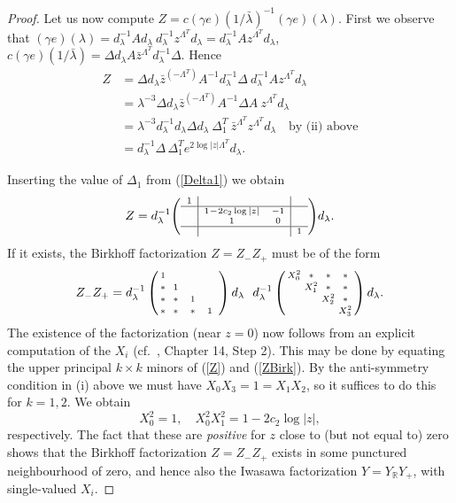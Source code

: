 \documentclass[a4paper,12pt,leqno]{amsart}
\numberwithin{equation}{section}
\theoremstyle{plain}
\theoremstyle{definition}
\newcommand{\R}{\mathbb R}
\newcommand{\la}{\lambda}
\newcommand{\De}{\Delta}
\newcommand{\bsp}{\left(\begin{smallmatrix}}
\newcommand{\esp}{\end{smallmatrix}\right)}
\newcommand{\MM}{\Lambda}
\newcommand{\gazi}{\gamma}
\begin{document}
{\begin{proof}
Let us now compute $Z=c( \gazi  e )(1/\bar\la)^{-1}  (\gazi e)(\la)$. 
First we observe that $(\gazi e)(\la)= d_\la^{-1}A d_\la\ d_\la^{-1} z^{\MM^T} d_\la = d_\la^{-1} A z^{\MM^T} d_\la$, 
$c( \gazi  e )(1/\bar\la)=
\De d_\la A \bar z^{\MM^T} d_\la^{-1} \De$.   
Hence
\begin{align*}
Z&=
\De d_\la \bar z^{(-\MM^T)} A^{-1}  d_\la^{-1} \De  
\ 
d_\la^{-1} A z^{\MM^T} d_\la
\\
&=\la^{-3} \De d_\la \bar z^{(-\MM^T)} A^{-1} \De A\   z^{\MM^T} d_\la\\
&=\la^{-3} d_\la^{-1} d_\la \De d_\la\   \De_1^T\  \bar z^{\MM^T} z^{\MM^T} d_\la \quad\text{by (ii) above}
\\
&=d_\la^{-1} \De\,  \De_1^T e^{2\log\vert z\vert \MM^T} d_\la.
\end{align*}
 
Inserting the value of $\De_1$ from (\ref{Delta1}) we obtain
\begin{equation}\label{Z}
Z=
d_\la^{-1} 
{\scriptsize
\left(
\begin{array}{c|cc|c}
1 & & & \\
\hline
 & 1\!-\!2c_2\log\vert z\vert & -1 & \\
 & 1 & 0 & \\
 \hline
 & & & 1
\end{array}
\right)
}
d_\la.
\end{equation}
If it exists, the Birkhoff factorization $Z=Z_-Z_+$ must be of the form
\begin{equation}\label{ZBirk}
Z_-Z_+=
d_\la^{-1} 
\bsp
 \vphantom{ X_0^2} 1 & \hphantom{ X_0^2} & \hphantom{ X_0^2} & \hphantom{ X_0^2} \\
* &  \vphantom{ X_0^2} 1 & & \\
* & * &  \vphantom{ X_0^2} 1 & \\
* & * & * &  \vphantom{ X_0^2} 1
\esp
d_\la
\ \ 
d_\la^{-1} 
\bsp
 X_0^2 & * &* & *\\
  &  X_1^2 & *& *\\
  &   &  X_2^2 & *\\
  &   &   &  X_3^2
\esp
d_\la.
\end{equation}
The existence of the factorization (near $z=0$) now follows from an explicit computation of the $ X_i$ (cf.\  \cite{Gu97}, Chapter 14, Step 2).  This may be done by equating the upper principal $k\times k$ minors of (\ref{Z}) and (\ref{ZBirk}). By the anti-symmetry condition in (i) above we must have $ X_0 X_3=1= X_1 X_2$, so it suffices to do this for $k=1,2$. We obtain
\[
 X_0^2=1,\quad  X_0^2 X_1^2=1\!-\!2c_2\log\vert z\vert,
\]
respectively. The fact that these are {\em positive} for $z$ close to (but not equal to) zero shows that the 
Birkhoff factorization $Z=Z_-Z_+$ exists in some punctured neighbourhood of zero, and hence also the Iwasawa factorization $Y=Y_\R Y_+$, with single-valued $ X_i$.  
 

\end{proof}}
\end{document}
